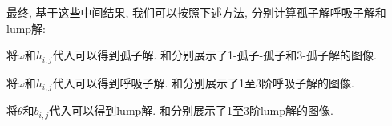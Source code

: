 最终, 基于这些中间结果, 我们可以按照下述方法, 分别计算孤子解\D 呼吸子解和lump解:
\begin{compactitem}[\textbullet]
\item 将$\omega$和$h_{i,j}$代入可以得到孤子解. \D {}和分别展示了1-孤子-孤子和3-孤子解的图像. 
\item 将$\omega$和$h_{i,j}$代入可以得到呼吸子解. \D{}和分别展示了1至3阶呼吸子解的图像.
\item 将$\theta$和$b_{i,j}$代入可以得到lump解. \D{}和分别展示了1至3阶lump解的图像.  
\end{compactitem}

